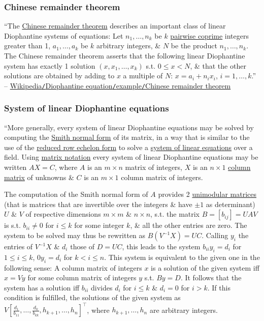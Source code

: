 \documentclass{article}
\numberwithin{equation}{section}
\begin{document}
\subsubsection{Chinese remainder theorem}
``The \href{https://en.wikipedia.org/wiki/Chinese_remainder_theorem}{Chinese remainder theorem} describes an important class of linear Diophantine systems of equations: Let $n_1,\ldots,n_k$ be $k$ \href{https://en.wikipedia.org/wiki/Pairwise_coprime}{pairwise coprime} integers greater than 1, $a_1,\ldots,a_k$ be $k$ arbitrary integers, \& $N$ be the product $n_1,\ldots,n_k$. The Chinese remainder theorem asserts that the following linear Diophantine system has exactly 1 solution $(x,x_1,\ldots,x_k)$ s.t. $0\le x < N$, \& that the other solutions are obtained by adding to $x$ a multiple of $N$: $x = a_i + n_ix_i$, $i = 1,\ldots,k$.'' -- \href{https://en.wikipedia.org/wiki/Diophantine_equation#Chinese_remainder_theorem}{Wikipedia\texttt{/}Diophantine equation\texttt{/}example\texttt{/}Chinese remainder theorem}

\subsubsection{System of linear Diophantine equations}
``More generally, every system of linear Diophantine equations may be solved by computing the \href{https://en.wikipedia.org/wiki/Smith_normal_form}{Smith normal form} of its matrix, in a way that is similar to the use of the \href{https://en.wikipedia.org/wiki/Reduced_row_echelon_form}{reduced row echelon form} to solve a \href{https://en.wikipedia.org/wiki/System_of_linear_equations}{system of linear equations} over a field. Using \href{https://en.wikipedia.org/wiki/Matrix_(mathematics)#Notation}{matrix notation} every system of linear Diophantine equations may be written $AX = C$, where $A$ is an $m\times n$ matrix of integers, $X$ is an $n\times 1$ \href{https://en.wikipedia.org/wiki/Column_matrix}{column matrix} of unknowns \& $C$ is an $m\times 1$ column matrix of integers.

The computation of the Smith normal form of $A$ provides 2 \href{https://en.wikipedia.org/wiki/Unimodular_matrix}{unimodular matrices} (that is matrices that are invertible over the integers \& have $\pm1$ as determinant) $U$ \& $V$ of respective dimensions $m\times m$ \& $n\times n$, s.t. the matrix $B = [b_{ij}] = UAV$ is s.t. $b_{ii}\ne 0$ for $i\le k$ for some integer $k$, \& all the other entries are zero. The system to be solved may thus be rewritten as $B(V^{-1}X) = UC$. Calling $y_i$ the entries of $V^{-1}X$ \& $d_i$ those of $D = UC$, this leads to the system $b_{ii}y_i = d_i$ for $1\le i\le k$, $0y_i = d_i$ for $k < i\le n$. This system is equivalent to the given one in the following sense: A column matrix of integers $x$ is a solution of the given system iff $x = Vy$ for some column matrix of integers $y$ s.t. $By = D$. It follows that the system has a solution iff $b_{ii}$ divides $d_i$ for $i\le k$ \& $d_i = 0$ for $i > k$. If this condition is fulfilled, the solutions of the given system as $V\left[\frac{d_1}{b_{11}},\ldots,\frac{d_k}{b_{kk}},h_{k+1},\ldots,h_n\right]^\top$, where $h_{k+1},\ldots,h_n$ are arbitrary integers.
\end{document}
